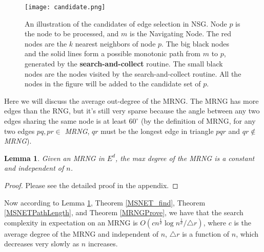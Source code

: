 \documentclass{vldb}
\newtheorem{lemma}{Lemma}
\begin{document}
\begin{figure}[t]
\begin{center}
\texttt{[image: candidate.png]}
\end{center}
   \caption{An illustration of the candidates of edge selection in NSG. Node $p$ is the node to be processed, and $m$ is the Navigating Node. The red nodes are the $k$ nearest neighbors of node $p$. The big black nodes and the solid lines form a possible monotonic path from $m$ to $p$, generated by the \textbf{search-and-collect} routine. The small black nodes are the nodes visited by the search-and-collect routine. All the nodes in the figure will be added to the candidate set of $p$.}
\label{candidate}
\end{figure}

Here we will discuss the average out-degree of the MRNG. The MRNG has more edges than the RNG, but it's still very sparse because the angle between any two edges sharing the same node is at least $60^\circ$ (by the definition of MRNG, for any two edges $pq,pr \in $ \textit{MRNG}, $qr$ must be the longest edge in triangle $pqr$ and $qr \notin$ \textit{MRNG}).
\begin{lemma}
\label{MRNGConstantDegree}
Given an MRNG in $E^d$, the max degree of the MRNG is a constant and independent of $n$.
\end{lemma}
\begin{proof}
Please see the detailed proof in the appendix.
\end{proof}


Now according to Lemma \ref{MRNGConstantDegree}, Theorem \ref{MSNET_find}, Theorem \ref{MSNETPathLength}, and Theorem \ref{MRNGProve}, we have that the search complexity in expectation on an MRNG is $O(cn^{\frac{1}{d}}\log n^{\frac{1}{d}}/\triangle{r})$, where $c$ is the average degree of the MRNG and independent of $n$, $\triangle{r}$ is a function of $n$, which decreases very slowly as $n$ increases. 

\end{document}
